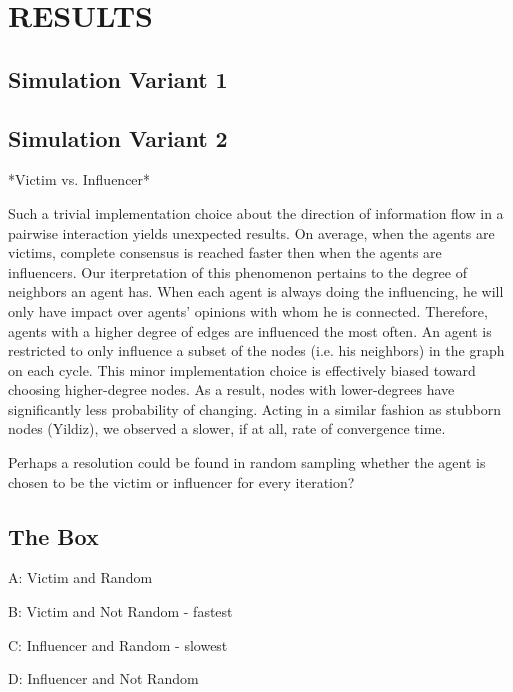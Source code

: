 
\section{RESULTS}

\subsection{Simulation Variant 1}





\subsection{Simulation Variant 2}

*Victim vs. Influencer*

Such a trivial implementation choice about the direction of information flow 
in a pairwise interaction yields unexpected results. On average, when the 
agents are victims, complete consensus is reached faster then when the agents
are influencers. Our iterpretation of this phenomenon pertains to the degree
of neighbors an agent has. When each agent is always doing the influencing, 
he will only have impact over agents' opinions with whom he is connected. 
Therefore, agents with a higher degree of edges are influenced the most
often. An agent is restricted to only influence a subset of the nodes
(i.e. his neighbors) in the graph on each cycle. This minor implementation
choice is effectively biased toward choosing higher-degree nodes. As a result,
nodes with lower-degrees have significantly less probability of changing. 
Acting in a similar fashion as stubborn nodes (Yildiz), we observed a slower, 
if at all, rate of convergence time.

Perhaps a resolution could be found in random sampling whether the agent is chosen 
to be the victim or influencer for every iteration?


\subsection{The Box}


A: Victim and Random


B: Victim and Not Random
- fastest

C: Influencer and Random
- slowest


D: Influencer and Not Random
